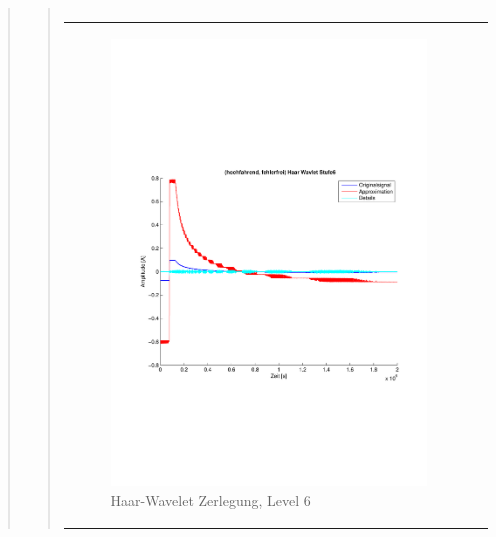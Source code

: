 \begin{quote}
\begin{quote}
\begin{center}
\begin{tabular}{ll}
                \end{tabular}
                \end{center}
                
                
                
          \begin{center}
                \begin{tabular}{ll}
    
                \hspace{-8em}
                    \begin{minipage}{0.6\textwidth}
    
                        \begin{figure}[H]
                            \label{fig:}
                            \includegraphics[scale=0.4, trim = 2cm 6cm 1cm
                            7.5cm,
                            clip]{./Bilder/Termin8/fehlerfrei_hochlaufen_Haar_Wavlet_lvl_6}
                            \caption{Haar-Wavelet Zerlegung, Level 6}
                        \end{figure}
    

\end{minipage}
\end{tabular}
\end{center}
\end{quote}
\end{quote}

